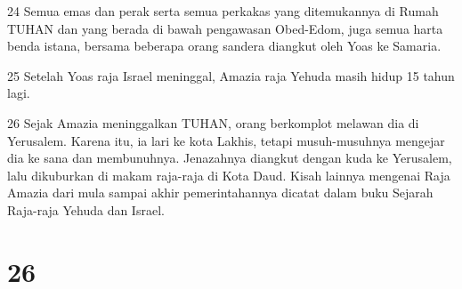 \par 24 Semua emas dan perak serta semua perkakas yang ditemukannya di Rumah TUHAN dan yang berada di bawah pengawasan Obed-Edom, juga semua harta benda istana, bersama beberapa orang sandera diangkut oleh Yoas ke Samaria.
\par 25 Setelah Yoas raja Israel meninggal, Amazia raja Yehuda masih hidup 15 tahun lagi.
\par 26 Sejak Amazia meninggalkan TUHAN, orang berkomplot melawan dia di Yerusalem. Karena itu, ia lari ke kota Lakhis, tetapi musuh-musuhnya mengejar dia ke sana dan membunuhnya. Jenazahnya diangkut dengan kuda ke Yerusalem, lalu dikuburkan di makam raja-raja di Kota Daud. Kisah lainnya mengenai Raja Amazia dari mula sampai akhir pemerintahannya dicatat dalam buku Sejarah Raja-raja Yehuda dan Israel.

\chapter{26}

